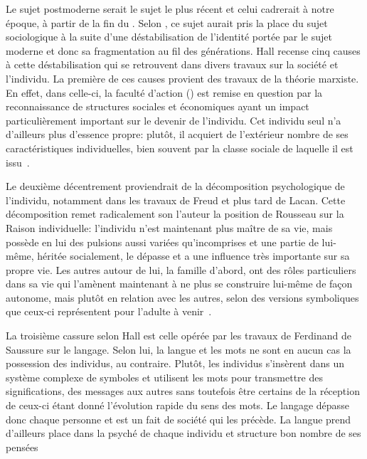 Le sujet postmoderne serait le sujet le plus récent et celui cadrerait à notre époque, à partir de la fin du . 
Selon \citeauthor{Hall1996a}, ce sujet aurait pris la place du sujet sociologique à la suite d'une déstabilisation de l'identité portée par le sujet moderne et donc sa fragmentation au fil des générations. 
Hall recense cinq causes à cette déstabilisation qui se retrouvent dans divers travaux sur la société et l'individu. 
La première de ces causes provient des travaux de la théorie marxiste. 
En effet, dans celle-ci, la faculté d'action () est remise en question par la reconnaissance de structures sociales et économiques ayant un impact particulièrement important sur le devenir de l'individu. 
Cet individu seul n'a d'ailleurs plus d'essence propre: plutôt, il acquiert de l'extérieur nombre de ses caractéristiques individuelles, bien souvent par la classe sociale de laquelle il est issu~\citeyearpar[606]{Hall1996a}.

Le deuxième décentrement proviendrait de la décomposition psychologique de l'individu, notamment dans les travaux de Freud et plus tard de Lacan. 
Cette décomposition remet radicalement son l'auteur la position de Rousseau sur la Raison individuelle: l'individu n'est maintenant plus maître de sa vie, mais possède en lui des pulsions aussi variées qu'incomprises et une partie de lui-même, héritée socialement, le dépasse et a une influence très importante sur sa propre vie. 
Les autres autour de lui, la famille d'abord, ont des rôles particuliers dans sa vie qui l'amènent maintenant à ne plus se construire lui-même de façon autonome, mais plutôt en relation avec les autres, selon des versions symboliques que ceux-ci représentent pour l'adulte à venir~\citeyearpar[ 607--608]{Hall1996a}.

La troisième cassure selon Hall est celle opérée par les travaux de Ferdinand de Saussure sur le langage. 
Selon lui, la langue et les mots ne sont en aucun cas la possession des individus, au contraire. 
Plutôt, les individus s'insèrent dans un système complexe de symboles et utilisent les mots pour transmettre des significations, des messages aux autres sans toutefois être certains de la réception de ceux-ci étant donné l'évolution rapide du sens des mots. 
Le langage dépasse donc chaque personne et est un fait de société qui les précède. 
La langue prend d'ailleurs place dans la psyché de chaque individu et structure bon nombre de ses pensées~\citeyearpar[608--609]{Hall1996a}

